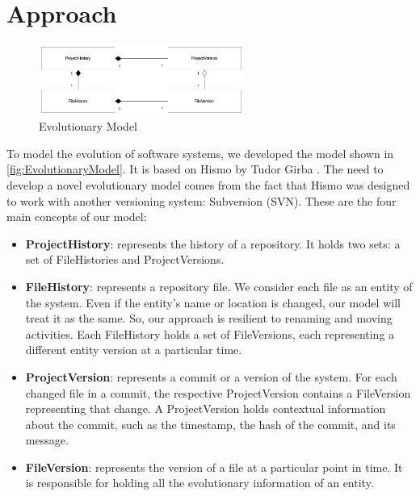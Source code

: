 \documentclass[11pt,twoside,english,singlespacing,headsepline,consistentlayout]{auxiliary/si-msc-thesis}
\begin{document}
\section*{Approach}
\begin{figure}[ht]
    \begin{center}
        \includegraphics[width=0.6\textwidth]{images/approach/EvolutionModel.jpg}
    \end{center}
    \caption{Evolutionary Model}
    \label{fig:EvolutionaryModel}
\end{figure}


To model the evolution of software systems, we developed the model 
shown in \autoref{fig:EvolutionaryModel}. It is based on Hismo by Tudor Girba \cite{Girba2005}.
The need to develop a novel evolutionary model comes from the fact that Hismo was designed to work with another versioning system: Subversion (SVN). 
These are the four main concepts of our model: 
\begin{itemize}
    \item \textbf{ProjectHistory}: represents the history of a repository. It holds two sets: a set of FileHistories and ProjectVersions. 
    \item \textbf{FileHistory}: represents a repository file. We consider each file as an entity of the system. Even if the entity's name or location is changed, our model will treat it as the same. So, our approach is resilient to renaming and moving activities. Each FileHistory holds a set of FileVersions, each representing a different entity version at a particular time.  
    \item \textbf{ProjectVersion}: represents a commit or a version of the system. 
    For each changed file in a commit, the respective ProjectVersion contains a FileVersion representing that change.
    A ProjectVersion holds contextual information about the commit, such as the timestamp, the hash of the commit, and its message.
    \item \textbf{FileVersion}: represents the version of a file at a particular point in time.
    It is responsible for holding all the evolutionary information of an entity. 
\end{itemize}
\end{document}
